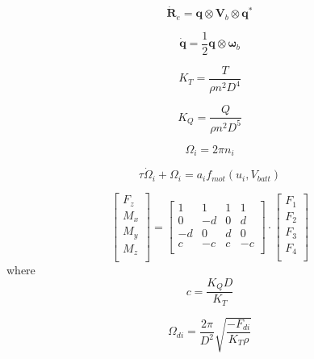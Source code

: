 \documentclass{article}
\numberwithin{equation}{section} %
\begin{document}
\begin{equation}
\dot{\boldsymbol{R}}_e = \boldsymbol{q} \otimes \boldsymbol{V}_b \otimes \boldsymbol{q}^*
\end{equation}

\begin{equation}
\dot{\boldsymbol{q}} = \frac{1}{2} \boldsymbol{q} \otimes \boldsymbol{\omega}_b
\end{equation}

\begin{equation}
K_T = \frac{T}{\rho n^2 D^4}
\end{equation}

\begin{equation}
K_Q = \frac{Q}{\rho n^2 D^5}
\end{equation}

\begin{equation}
\Omega_i = 2 \pi n_i
\end{equation}

\begin{equation}
\tau \dot{\Omega}_i + \Omega_i = a_i f_{mot} \left(u_i, V_{batt} \right)
\end{equation}

\begin{equation}
\begin{bmatrix}
	F_z \\
	M_x \\
	M_y \\
	M_z \\
\end{bmatrix}
=
\begin{bmatrix}
	1 & 1 & 1 & 1 \\
	0 &-d & 0 & d \\
   -d & 0 & d & 0 \\
	c &-c & c &-c \\
\end{bmatrix}
\cdot
\begin{bmatrix}
	F_1 \\
	F_2 \\
	F_3 \\
	F_4 \\
\end{bmatrix}
\end{equation}
where
\begin{equation}
c = \frac{K_Q D}{K_T}
\end{equation}

\begin{equation}
\Omega_{di}=\frac{2 \pi}{D^2} \sqrt{ \frac{-F_{di}}{K_T \rho}}
\end{equation}
\end{document}
